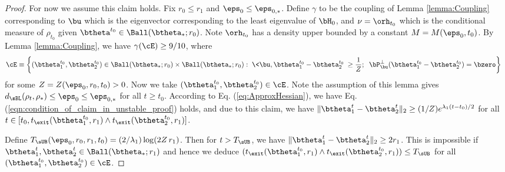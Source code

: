 \documentclass[11pt]{article}
\begin{document}
\begin{proof}
For now we assume this claim holds. Fix $r_0 \le r_1$ and $\eps_0 \le \eps_{0, *}$. Define $\gamma$  to be the coupling of Lemma \ref{lemma:Coupling} corresponding to $\bu$ which is the eigenvector corresponding to the least eigenvalue of $\bH_0$, and 
$\nu=\orh_{t_0}$ which is the conditional measure of $\rho_{t_0}$ given $\btheta^{t_0}\in\Ball(\btheta_*;r_0)$. Note $\orh_{t_0}$ has a density upper bounded by  a constant $M= M(\eps_0, t_0)$. By Lemma \ref{lemma:Coupling}, we have $\gamma(\cE) \ge 9/10$, where 
%
\begin{align}
\cE& \equiv \left\{(\btheta^{t_0}_1,\btheta^{t_0}_2)\in\Ball(\btheta_*;r_0)\times\Ball(\btheta_*;r_0):\; \<\bu,\btheta^{t_0}_1-\btheta^{t_0}_2\>\ge \frac{1}{Z};\;\; \bP^{\perp}_{\bu} 
(\btheta^{t_0}_1-\btheta^{t_0}_2)=\bzero\right\}\,
%
\end{align}
for some $Z = Z(\eps_0, r_0, t_0) > 0$. 
%
Now we take $(\btheta_1^{t_0}, \btheta_2^{t_0}) \in \cE$. Note the assumption of this lemma gives $d_{\sBL}(\rho_t,\rho_*)\le \eps_0 \le \eps_{0, *}$ for all $t \ge t_0$. According to Eq. (\ref{eq:ApproxHessian}), we have Eq. (\ref{eqn:condition_of_claim_in_unstable_proof}) holds, and due to this claim, we have $\| \btheta^t_1-\btheta^t_2 \|_2 \ge (1/Z) e^{\lambda_1 (t - t_0) / 2}$ for all $t \in [t_0, t_{\exit}(\btheta^{t_0}_1,r_1)\wedge t_{\exit}(\btheta^{t_0}_2,r_1)]$.  
 

Define $T_{\sUB}(\eps_0,r_0,r_1, t_0) = (2/\lambda_1) \log(2Z \, r_1)$. Then for $t>T_{\sUB}$, we have $\|\btheta_1^t-\btheta^t_2\|_2 \ge 2r_1$. This is impossible if $\btheta_1^t,\btheta^t_2\in \Ball(\btheta_*;r_1)$ and hence we deduce  
$(t_{\exit}(\btheta^{t_0}_1,r_1)\wedge t_{\exit}(\btheta^{t_0}_2,r_1))\le T_{\sUB}$ for all $(\btheta^{t_0}_1,\btheta^{t_0}_2)\in\cE$. 



\end{proof}
\end{document}
